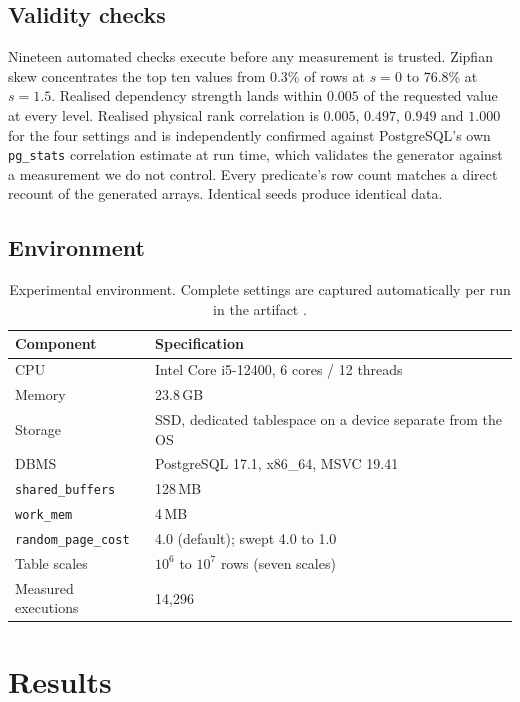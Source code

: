 \documentclass[preprint,12pt,authoryear]{elsarticle}
\newcommand{\rpc}{\texttt{random\_page\_cost}}
\newcommand{\sbuf}{\texttt{shared\_buffers}}
\begin{document}
\subsection{Validity checks}

Nineteen automated checks execute before any measurement is trusted.
Zipfian skew concentrates the top ten values from 0.3\% of rows at
$s = 0$ to 76.8\% at $s = 1.5$. Realised dependency strength lands
within $0.005$ of the requested value at every level. Realised physical
rank correlation is $0.005$, $0.497$, $0.949$ and $1.000$ for the four
settings and is independently confirmed against PostgreSQL's own
\texttt{pg\_stats} correlation estimate at run time, which validates the
generator against a measurement we do not control. Every predicate's
row count matches a direct recount of the generated arrays. Identical
seeds produce identical data.

\subsection{Environment}

\begin{table}[htbp]
\centering
\caption{Experimental environment. Complete settings are captured
automatically per run in the artifact \citep{artifact2026}.}
\label{tab:env}
\small
\begin{tabular}{@{}ll@{}}
\toprule
Component & Specification \\
\midrule
CPU & Intel Core i5-12400, 6 cores / 12 threads \\
Memory & 23.8\,GB \\
Storage & SSD, dedicated tablespace on a device separate from the OS \\
DBMS & PostgreSQL 17.1, x86\_64, MSVC 19.41 \\
\sbuf{} & 128\,MB \\
\texttt{work\_mem} & 4\,MB \\
\rpc{} & 4.0 (default); swept 4.0 to 1.0 \\
Table scales & $10^6$ to $10^7$ rows (seven scales) \\
Measured executions & 14{,}296 \\
\bottomrule
\end{tabular}
\end{table}

\section{Results}
\label{sec:results}
\end{document}

